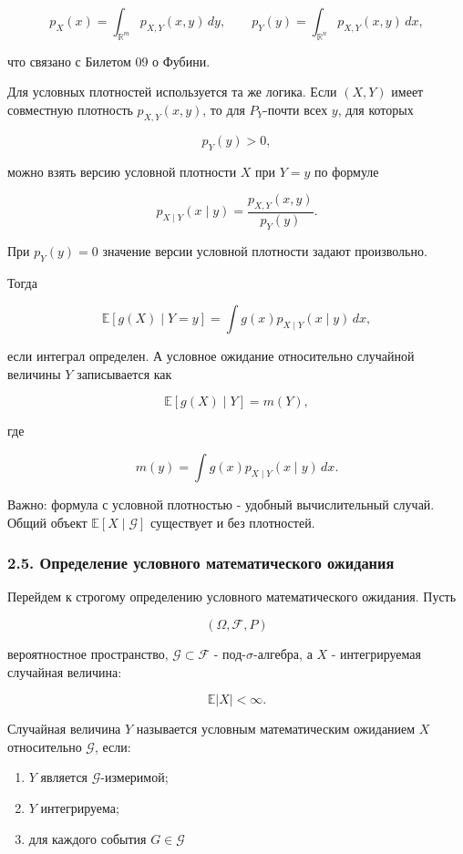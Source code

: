 \documentclass[
  11pt,
  a4paper,
]{article}
\providecommand{\tightlist}{%
  \setlength{\itemsep}{0pt}\setlength{\parskip}{0pt}}
\begin{document}
\[
p_X(x)=\int_{\mathbb R^m}p_{X,Y}(x,y)\,dy,
\qquad
p_Y(y)=\int_{\mathbb R^n}p_{X,Y}(x,y)\,dx,
\]

что связано с Билетом 09 о Фубини.

Для условных плотностей используется та же логика. Если \((X,Y)\) имеет
совместную плотность \(p_{X,Y}(x,y)\), то для \(P_Y\)-почти всех \(y\),
для которых

\[
p_Y(y)>0,
\]

можно взять версию условной плотности \(X\) при \(Y=y\) по формуле

\[
p_{X\mid Y}(x\mid y)
=
\frac{p_{X,Y}(x,y)}{p_Y(y)}.
\]

При \(p_Y(y)=0\) значение версии условной плотности задают произвольно.

Тогда

\[
\mathbb E[g(X)\mid Y=y]
=
\int g(x)p_{X\mid Y}(x\mid y)\,dx,
\]

если интеграл определен. А условное ожидание относительно случайной
величины \(Y\) записывается как

\[
\mathbb E[g(X)\mid Y]
=
m(Y),
\]

где

\[
m(y)=\int g(x)p_{X\mid Y}(x\mid y)\,dx.
\]

Важно: формула с условной плотностью - удобный вычислительный случай.
Общий объект \(\mathbb E[X\mid\mathcal G]\) существует и без плотностей.

\subsubsection{2.5. Определение условного математического
ожидания}\label{ux43eux43fux440ux435ux434ux435ux43bux435ux43dux438ux435-ux443ux441ux43bux43eux432ux43dux43eux433ux43e-ux43cux430ux442ux435ux43cux430ux442ux438ux447ux435ux441ux43aux43eux433ux43e-ux43eux436ux438ux434ux430ux43dux438ux44f}

Перейдем к строгому определению условного математического ожидания.
Пусть

\[
(\Omega,\mathcal F,P)
\]

вероятностное пространство, \(\mathcal G\subset\mathcal F\) -
под-\(\sigma\)-алгебра, а \(X\) - интегрируемая случайная величина:

\[
\mathbb E|X|<\infty.
\]

Случайная величина \(Y\) называется условным математическим ожиданием
\(X\) относительно \(\mathcal G\), если:

\begin{enumerate}
\def\labelenumi{\arabic{enumi}.}
\tightlist
\item
  \(Y\) является \(\mathcal G\)-измеримой;
\item
  \(Y\) интегрируема;
\item
  для каждого события \(G\in\mathcal G\)
\end{enumerate}
\end{document}
